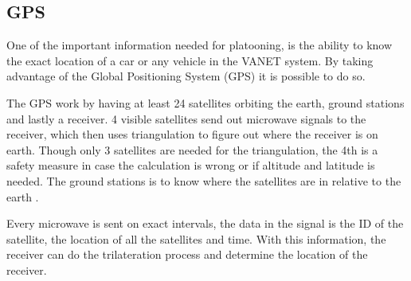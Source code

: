 \subsection{GPS}
One of the important information needed for platooning, is the ability to know the exact location of a car or any vehicle in the VANET system. By taking advantage of the Global Positioning System (GPS) it is possible to do so.\par
% 
% 
The GPS work by having at least 24 satellites orbiting the earth, ground stations and lastly a receiver. 4 visible satellites send out microwave signals to the receiver, which then uses triangulation to figure out where the receiver is on earth. Though only 3 satellites are needed for the triangulation, the 4th is a safety measure in case the calculation is wrong or if altitude and latitude is needed. The ground stations is to know where the satellites are in relative to the earth \cite{MiTACIntl.2011HowWork}.\par
% 
% 
Every microwave is sent on exact intervals, the data in the signal is the ID of the satellite, the location of all the satellites and time. With this information, the receiver can do the trilateration process and determine the location of the receiver.